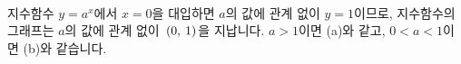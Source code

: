 \begin{figure}[h]\centering {}\
\qquad\qquad
\centering {}\
\end{figure}


지수함수 $y=a^x$에서 $x=0$을 대입하면 $a$의 값에 관계 없이 $y=1$이므로, 지수함수의 그래프는 $a$의 값에 관계 없이 $\mathrm{}\left(0,\:1\right)$을 지납니다. $a>1$이면 (a)와 같고, $0<a<1$이면 (b)와 같습니다.

